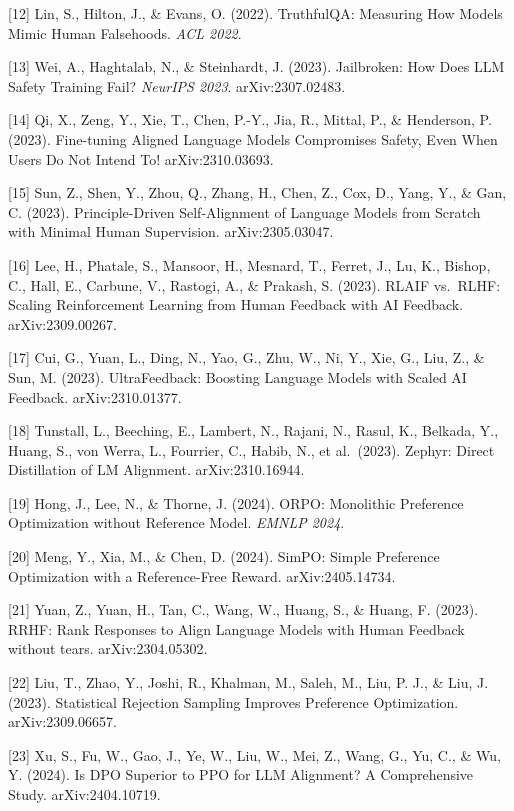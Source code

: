 {[}12{]} Lin, S., Hilton, J., \& Evans, O. (2022). TruthfulQA: Measuring How Models Mimic Human Falsehoods. \emph{ACL 2022}.

{[}13{]} Wei, A., Haghtalab, N., \& Steinhardt, J. (2023). Jailbroken: How Does LLM Safety Training Fail? \emph{NeurIPS 2023}. arXiv:2307.02483.

{[}14{]} Qi, X., Zeng, Y., Xie, T., Chen, P.-Y., Jia, R., Mittal, P., \& Henderson, P. (2023). Fine-tuning Aligned Language Models Compromises Safety, Even When Users Do Not Intend To! arXiv:2310.03693.

{[}15{]} Sun, Z., Shen, Y., Zhou, Q., Zhang, H., Chen, Z., Cox, D., Yang, Y., \& Gan, C. (2023). Principle-Driven Self-Alignment of Language Models from Scratch with Minimal Human Supervision. arXiv:2305.03047.

{[}16{]} Lee, H., Phatale, S., Mansoor, H., Mesnard, T., Ferret, J., Lu, K., Bishop, C., Hall, E., Carbune, V., Rastogi, A., \& Prakash, S. (2023). RLAIF vs.~RLHF: Scaling Reinforcement Learning from Human Feedback with AI Feedback. arXiv:2309.00267.

{[}17{]} Cui, G., Yuan, L., Ding, N., Yao, G., Zhu, W., Ni, Y., Xie, G., Liu, Z., \& Sun, M. (2023). UltraFeedback: Boosting Language Models with Scaled AI Feedback. arXiv:2310.01377.

{[}18{]} Tunstall, L., Beeching, E., Lambert, N., Rajani, N., Rasul, K., Belkada, Y., Huang, S., von Werra, L., Fourrier, C., Habib, N., et al.~(2023). Zephyr: Direct Distillation of LM Alignment. arXiv:2310.16944.

{[}19{]} Hong, J., Lee, N., \& Thorne, J. (2024). ORPO: Monolithic Preference Optimization without Reference Model. \emph{EMNLP 2024}.

{[}20{]} Meng, Y., Xia, M., \& Chen, D. (2024). SimPO: Simple Preference Optimization with a Reference-Free Reward. arXiv:2405.14734.

{[}21{]} Yuan, Z., Yuan, H., Tan, C., Wang, W., Huang, S., \& Huang, F. (2023). RRHF: Rank Responses to Align Language Models with Human Feedback without tears. arXiv:2304.05302.

{[}22{]} Liu, T., Zhao, Y., Joshi, R., Khalman, M., Saleh, M., Liu, P. J., \& Liu, J. (2023). Statistical Rejection Sampling Improves Preference Optimization. arXiv:2309.06657.

{[}23{]} Xu, S., Fu, W., Gao, J., Ye, W., Liu, W., Mei, Z., Wang, G., Yu, C., \& Wu, Y. (2024). Is DPO Superior to PPO for LLM Alignment? A Comprehensive Study. arXiv:2404.10719.

